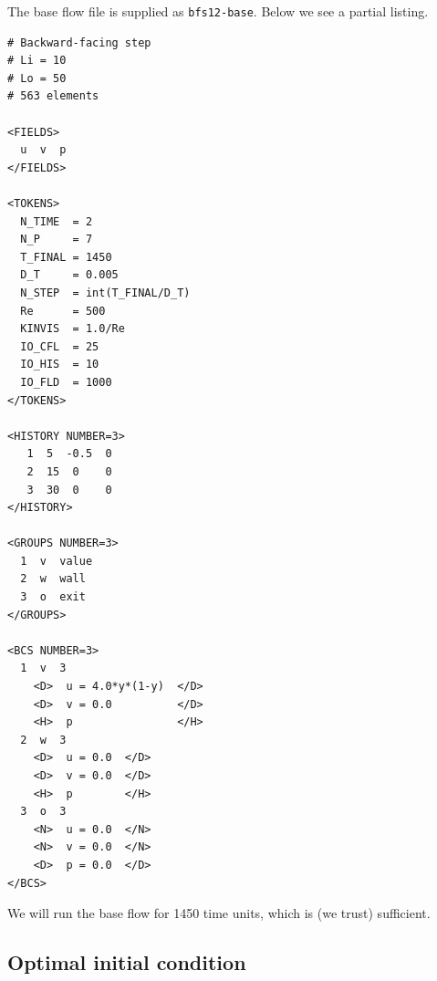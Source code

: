 \documentclass[11pt,a4paper]{report}
\begin{document}
The base flow file is supplied as \verb+bfs12-base+. Below we see a
partial listing.
{\small
\begin{verbatim}
# Backward-facing step
# Li = 10
# Lo = 50
# 563 elements

<FIELDS>
  u  v  p
</FIELDS>

<TOKENS>
  N_TIME  = 2
  N_P     = 7
  T_FINAL = 1450
  D_T     = 0.005
  N_STEP  = int(T_FINAL/D_T)
  Re      = 500
  KINVIS  = 1.0/Re
  IO_CFL  = 25
  IO_HIS  = 10
  IO_FLD  = 1000
</TOKENS>

<HISTORY NUMBER=3>
   1  5	 -0.5  0
   2  15  0    0
   3  30  0    0
</HISTORY>

<GROUPS NUMBER=3>
  1  v  value
  2  w  wall
  3  o  exit
</GROUPS>

<BCS NUMBER=3>
  1  v  3
    <D>  u = 4.0*y*(1-y)  </D>
    <D>  v = 0.0          </D>
    <H>  p                </H>
  2  w  3
    <D>  u = 0.0  </D>
    <D>  v = 0.0  </D>
    <H>  p        </H>
  3  o  3
    <N>  u = 0.0  </N>
    <N>  v = 0.0  </N>
    <D>  p = 0.0  </D>
</BCS>
\end{verbatim}
}
\noindent We will run the base flow for 1450 time units, which is (we
trust) sufficient.

\subsection{Optimal initial condition}
\label{sec.bfstg}
\end{document}
